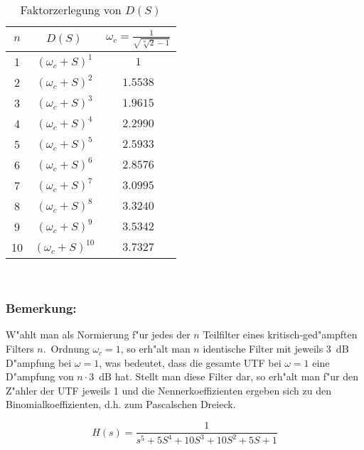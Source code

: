\begin{table}[!htb]
\begin{center}
{\footnotesize
\begin{tabular}{|c||c|c|}\hline
$n$ & $D(S)$ & $\omega_c=\frac{1}{\sqrt{\sqrt[n]{2}-1}}$ \\ \hline\hline
  1 & $(\omega_c +S)^1$ & $1$   \\ \hline
  2 & $(\omega_c +S)^2$ & $1.5538$   \\ \hline
  3 & $(\omega_c +S)^3$ & $1.9615$   \\ \hline
  4 & $(\omega_c +S)^4$ & $2.2990$   \\ \hline
  5 & $(\omega_c +S)^5$ & $2.5933$   \\ \hline
  6 & $(\omega_c +S)^6$ & $2.8576$   \\ \hline
  7 & $(\omega_c +S)^7$ & $3.0995$   \\ \hline
  8 & $(\omega_c +S)^8$ & $3.3240$   \\ \hline
  9 & $(\omega_c +S)^9$ & $3.5342$   \\ \hline
 10 & $(\omega_c +S)^{10}$ & $3.7327$   \\ \hline
\end{tabular}\vspace*{-2mm}\caption{Faktorzerlegung von $D(S)$}
}
\end{center}
\vspace*{-8mm}
\end{table}~\\



\vspace*{-6mm}
\subsubsection{Bemerkung:}
W"ahlt man als Normierung f"ur jedes der $n$ Teilfilter eines kritisch-ged"ampften Filters $n.$~Ordnung $\omega_c=1$, so erh"alt man $n$ identische Filter mit jeweils 3~dB D"ampfung bei $\omega=1$, was bedeutet, dass die gesamte UTF bei $\omega=1$ eine D"ampfung von $n\cdot 3$~dB hat. Stellt man diese Filter dar, so erh"alt man f"ur den Z"ahler der UTF jeweils 1 und die Nennerkoeffizienten ergeben sich zu den Binomialkoeffizienten, d.h. zum Pascalschen Dreieck.

\begin{equation*}
H(s)=\frac{1}{s^5+5S^4+10S^3+10S^2+5S+1}
\end{equation*}~\\

